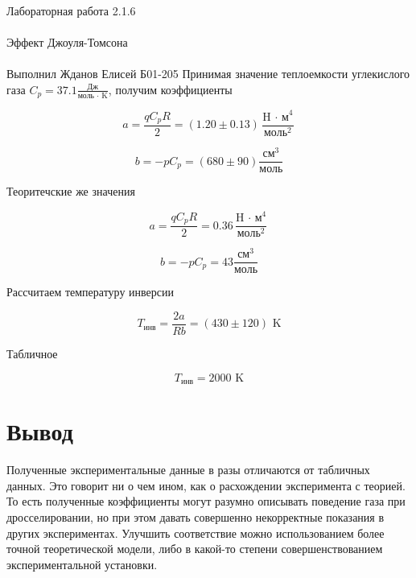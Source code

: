 \documentclass{astroedu-lab}
\begin{document}
\begin{problem}{\huge Лабораторная работа 2.1.6\\\\Эффект Джоуля-Томсона\\\\Выполнил Жданов Елисей Б01-205}
Принимая значение теплоемкости углекислого газа $C_p = 37.1 \frac{\text{Дж}}{\text{моль $\cdot$ K}}$, получим коэффициенты

\begin{equation}
	a = \frac{q C_p R}{2} = (1.20 \pm 0.13) \frac{\text{H $\cdot$ м}^4}{\text{моль}^2}
\end{equation}

\begin{equation}
	b = - p C_p = (680 \pm 90) \frac{\text{см}^3}{\text{моль}}
\end{equation}

Теоритечские же значения

\begin{equation}
	a = \frac{q C_p R}{2} = 0.36 \frac{\text{H $\cdot$ м}^4}{\text{моль}^2}
\end{equation}

\begin{equation}
	b = - p C_p = 43 \frac{\text{см}^3}{\text{моль}}
\end{equation}

Рассчитаем температуру инверсии

\begin{equation}
	T_\text{инв} = \frac{2 a}{R b} = (430 \pm 120) \text{ K}
\end{equation}

Табличное

\begin{equation}
	T_\text{инв} = 2000 \text{ K}
\end{equation}

\section{Вывод}

Полученные экспериментальные данные в разы отличаются от табличных данных. Это говорит ни о чем ином, как о расхождении эксперимента с теорией. То есть полученные коэффициенты могут разумно описывать поведение газа при дросселировании, но при этом давать совершенно некорректные показания в других экспериментах. Улучшить соответствие можно использованием более точной теоретической модели, либо в какой-то степени совершенствованием экспериментальной установки.

\end{problem}
\end{document}
